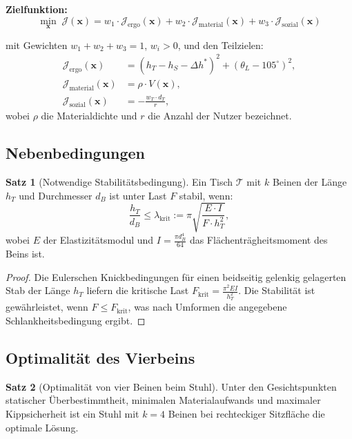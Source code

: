 ﻿\documentclass[a4paper,12pt]{article}
\theoremstyle{definition}
\newtheorem{satz}{Satz}
\begin{document}
\textbf{Zielfunktion:}
\[
	\min_{\mathbf{x}} \; \mathcal{J}(\mathbf{x})
	= w_1 \cdot \mathcal{J}_{\mathrm{ergo}}(\mathbf{x})
	+ w_2 \cdot \mathcal{J}_{\mathrm{material}}(\mathbf{x})
	+ w_3 \cdot \mathcal{J}_{\mathrm{sozial}}(\mathbf{x})
\]

mit Gewichten $w_1 + w_2 + w_3 = 1$, $w_i > 0$, und den Teilzielen:
\begin{align*}
	\mathcal{J}_{\mathrm{ergo}}(\mathbf{x})     &= \left(h_T - h_S - \Delta h^*\right)^2
	                                               + \left(\theta_L - 105^{\circ}\right)^2, \\
	\mathcal{J}_{\mathrm{material}}(\mathbf{x}) &= \rho \cdot V(\mathbf{x}), \\
	\mathcal{J}_{\mathrm{sozial}}(\mathbf{x})   &= -\frac{w_T \cdot d_T}{r},
\end{align*}
wobei $\rho$ die Materialdichte und $r$ die Anzahl der Nutzer bezeichnet.

\subsection{Nebenbedingungen}

\begin{satz}[Notwendige Stabilit\"{a}tsbedingung]
\label{satz:stabilitaet}
	Ein Tisch $\mathcal{T}$ mit $k$ Beinen der L\"{a}nge $h_T$ und Durchmesser $d_B$
	ist unter Last $F$ stabil, wenn:
	\[
		\frac{h_T}{d_B} \leq \lambda_{\mathrm{krit}} := \pi \sqrt{\frac{E \cdot I}{F \cdot h_T^2}},
	\]
	wobei $E$ der Elastizit\"{a}tsmodul und $I = \frac{\pi d_B^4}{64}$ das
	Fl\"{a}chentr\"{a}gheitsmoment des Beins ist.
\end{satz}

\begin{proof}
	Die Eulerschen Knickbedingungen f\"{u}r einen beidseitig gelenkig gelagerten Stab der
	L\"{a}nge $h_T$ liefern die kritische Last
	$F_{\mathrm{krit}} = \frac{\pi^2 E I}{h_T^2}$.
	Die Stabilit\"{a}t ist gew\"{a}hrleistet, wenn $F \leq F_{\mathrm{krit}}$, was nach Umformen
	die angegebene Schlankheitsbedingung ergibt.
\end{proof}

\subsection{Optimalit\"{a}t des Vierbeins}

\begin{satz}[Optimalit\"{a}t von vier Beinen beim Stuhl]
\label{satz:vierbeiner}
	Unter den Gesichtspunkten statischer \"{U}berbestimmtheit, minimalen Materialaufwands
	und maximaler Kippsicherheit ist ein Stuhl mit $k = 4$ Beinen bei rechteckiger
	Sitzfl\"{a}che die optimale L\"{o}sung.
\end{satz}
\end{document}
